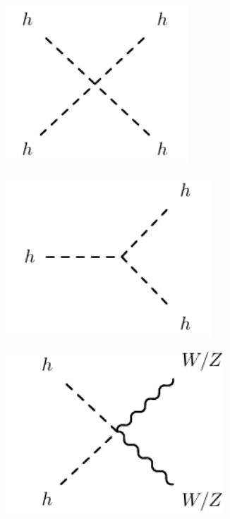 \begin{figure}
	\centering
	\begin{subfigure}[b]{0.33\linewidth}
		\centering\includegraphics[width=0.75\textwidth]{h_boson_quartic_vertex}
	\end{subfigure}%
	\begin{subfigure}[b]{0.33\linewidth}
		\centering\includegraphics[width=0.85\textwidth]{h_boson_cubic_vertex}
	\end{subfigure}%
	\begin{subfigure}[b]{0.33\linewidth}
		\centering\includegraphics[width=0.9\textwidth]{h_boson_digauge_vertex}

\end{subfigure}
\end{figure}
